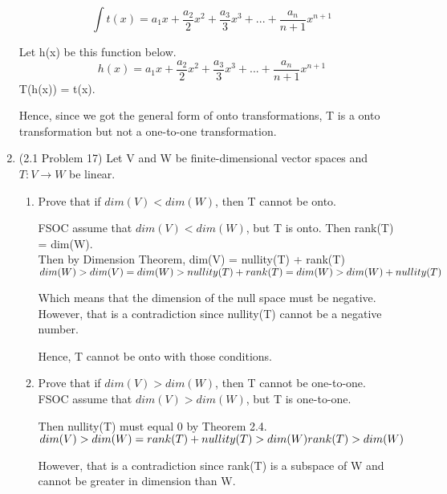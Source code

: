 \documentclass[12pt]{article}
\begin{document}
\begin{enumerate}
    \begin{equation}
        \int t(x) = a_1x + \frac{a_2}{2}x^2 + \frac{a_3}{3}x^3 + ... + \frac{a_n}{n + 1}x^{n + 1}
    \end{equation}

    Let h(x) be this function below. 
    \begin{equation}
        h(x) = a_1x + \frac{a_2}{2}x^2 + \frac{a_3}{3}x^3 + ... + \frac{a_n}{n + 1}x^{n + 1}
    \end{equation}
    T(h(x)) = t(x). 

    Hence, since we got the general form of onto transformations, T is a onto transformation but not a one-to-one transformation.
    \qedsymbol{}

    \item (2.1 Problem 17) Let V and W be finite-dimensional vector spaces and $T: V \xrightarrow{} W$ be linear. 
        \begin{enumerate}[label=(\alph*)]
            \item Prove that if $dim(V) < dim(W)$, then T cannot be onto. 

            FSOC assume that $dim(V) < dim(W)$, but T is onto. Then rank(T) = dim(W). \\ 
            Then by Dimension Theorem, dim(V) = nullity(T) + rank(T) \\
            
            $dim(W) > dim(V) = dim(W) > nullity(T) + rank(T)  \\
            = dim(W) > dim(W) + nullity(T) $
            
            Which means that the dimension of the null space must be negative. However, that is a contradiction since nullity(T) cannot be a negative number.

            Hence, T cannot be onto with those conditions. 
            \qedsymbol{}
            \item Prove that if $dim(V) > dim(W)$, then T cannot be one-to-one. \\
            FSOC assume that $dim(V) > dim(W)$, but T is one-to-one. 

            Then nullity(T) must equal 0 by Theorem 2.4. 
            $dim(V) > dim(W) = rank(T) + nullity(T) > dim(W) \\ 
            rank(T) > dim(W)$ 

            However, that is a contradiction since rank(T) is a subspace of W and cannot be greater in dimension than W. 


\end{enumerate}
\end{enumerate}
\end{document}

